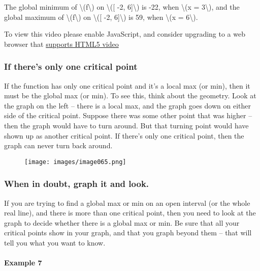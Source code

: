 The global minimum of \textbackslash{}(f\textbackslash{}) on
\textbackslash{}({[} -2, 6{]}\textbackslash{}) is -22, when
\textbackslash{}(x = 3\textbackslash{}), and the global maximum of
\textbackslash{}(f\textbackslash{}) on \textbackslash{}({[} -2,
6{]}\textbackslash{}) is 59, when \textbackslash{}(x =
6\textbackslash{}).

To view this video please enable JavaScript, and consider upgrading to a
web browser that \href{http://videojs.com/html5-video-support/}{supports
HTML5 video}

\hypertarget{if-theres-only-one-critical-point}{%
\subsubsection{If there's only one critical
point}\label{if-theres-only-one-critical-point}}

If the function has only one critical point and it's a local max (or
min), then it must be the global max (or min). To see this, think about
the geometry. Look at the graph on the left -- there is a local max, and
the graph goes down on either side of the critical point. Suppose there
was some other point that was higher -- then the graph would have to
turn around. But that turning point would have shown up as another
critical point. If there's only one critical point, then the graph can
never turn back around.

\begin{figure}
\centering
\texttt{[image: images/image065.png]}
\caption{}
\end{figure}

\hypertarget{when-in-doubt-graph-it-and-look.}{%
\subsubsection{When in doubt, graph it and
look.}\label{when-in-doubt-graph-it-and-look.}}

If you are trying to find a global max or min on an open interval (or
the whole real line), and there is more than one critical point, then
you need to look at the graph to decide whether there is a global max or
min. Be sure that all your critical points show in your graph, and that
you graph beyond them -- that will tell you what you want to know.

\hypertarget{example-7}{%
\paragraph{Example 7}\label{example-7}}

